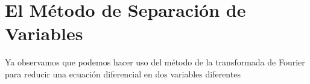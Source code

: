 \chapter{El Método de Separación de Variables}

Ya observamos que podemos hacer uso del método de la transformada de Fourier para reducir una ecuación diferencial en dos variables diferentes